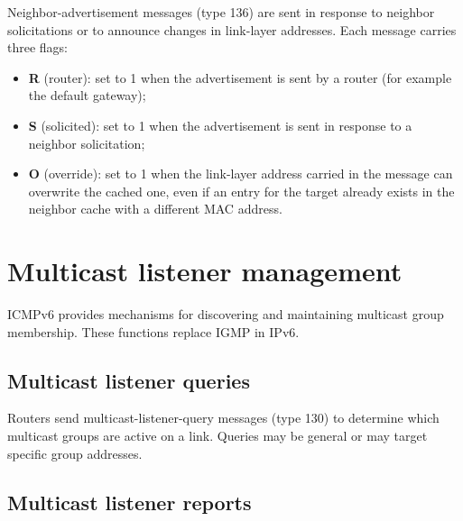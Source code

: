 Neighbor-advertisement messages (type 136) are sent in response to neighbor
solicitations or to announce changes in link-layer addresses. Each message
carries three flags:
\begin{itemize}
	\item \textbf{R} (router): set to 1 when the advertisement is sent by a router
	(for example the default gateway);
	\item \textbf{S} (solicited): set to 1 when the advertisement is sent in
	response to a neighbor solicitation;
	\item \textbf{O} (override): set to 1 when the link-layer address carried in
	the message can overwrite the cached one, even if an entry for the target
	already exists in the neighbor cache with a different MAC address.
\end{itemize}

\begin{center}
\end{center}

\section{Multicast listener management}

ICMPv6 provides mechanisms for discovering and maintaining multicast group membership. These functions replace IGMP in IPv6.

\begin{center}
\end{center}

\subsection{Multicast listener queries}

Routers send multicast-listener-query messages (type 130) to determine which multicast groups are active on a link. Queries may be general or may target specific group addresses.

\begin{center}
\end{center}

\subsection{Multicast listener reports}

